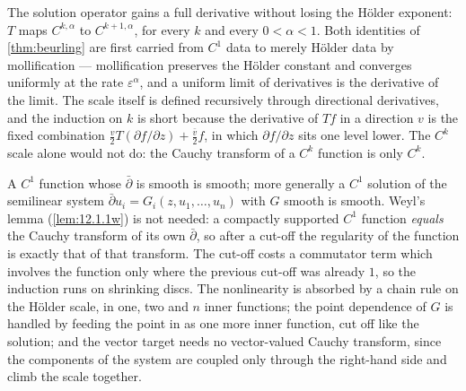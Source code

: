 \begin{proposition}
  \label{prop:schauder}
  \leanok
  The solution operator gains a full derivative without losing the H\"older
  exponent: $T$ maps $C^{k,\alpha}$ to $C^{k+1,\alpha}$, for every $k$ and every
  $0 < \alpha < 1$.  Both identities of \ref{thm:beurling} are first carried from
  $C^1$ data to merely H\"older data by mollification --- mollification preserves
  the H\"older constant and converges uniformly at the rate $\varepsilon^\alpha$,
  and a uniform limit of derivatives is the derivative of the limit.  The scale
  itself is defined recursively through directional derivatives, and the
  induction on $k$ is short because the derivative of $Tf$ in a direction $v$ is
  the fixed combination $\tfrac{v}{2} T(\partial f/\partial z) + \tfrac{\bar
  v}{2} f$, in which $\partial f/\partial z$ sits one level lower.  The $C^k$
  scale alone would not do: the Cauchy transform of a $C^k$ function is only
  $C^k$.
\end{proposition}

\begin{theorem}
  \label{thm:dbar-bootstrap}
  \leanok
  A $C^1$ function whose $\bar\partial$ is smooth is smooth; more generally a
  $C^1$ solution of the semilinear system $\bar\partial u_i = G_i(z, u_1, \dots,
  u_n)$ with $G$ smooth is smooth.  Weyl's lemma (\ref{lem:12.1.1w}) is not
  needed: a compactly supported $C^1$ function \emph{equals} the Cauchy transform
  of its own $\bar\partial$, so after a cut-off the regularity of the function is
  exactly that of that transform.  The cut-off costs a commutator term which
  involves the function only where the previous cut-off was already $1$, so the
  induction runs on shrinking discs.  The nonlinearity is absorbed by a chain
  rule on the H\"older scale, in one, two and $n$ inner functions; the point
  dependence of $G$ is handled by feeding the point in as one more inner
  function, cut off like the solution; and the vector target needs no
  vector-valued Cauchy transform, since the components of the system are coupled
  only through the right-hand side and climb the scale together.
\end{theorem}

